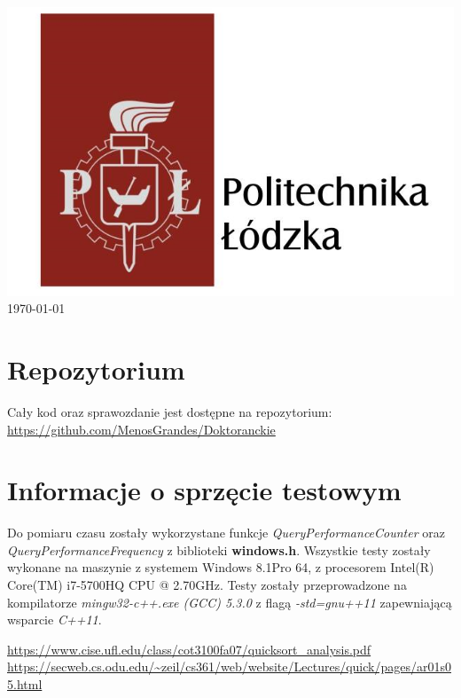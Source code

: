 \begin{titlepage}
\includegraphics[scale=0.36]{logo.png}\\[1.3cm]
 


{\large \today}\\[5cm] %

\vfill %

\end{titlepage}






 \tableofcontents 
 \section{Repozytorium}
 Cały kod oraz sprawozdanie jest dostępne na repozytorium:
 \url{https://github.com/MenosGrandes/Doktoranckie}
\section{Informacje o sprzęcie testowym}
Do pomiaru czasu zostały wykorzystane funkcje \textit{QueryPerformanceCounter} oraz \textit{QueryPerformanceFrequency} z biblioteki \textbf{windows.h}. Wszystkie testy zostały wykonane na maszynie z systemem Windows 8.1Pro 64, z procesorem Intel(R) Core(TM) i7-5700HQ CPU @ 2.70GHz. Testy zostały przeprowadzone na kompilatorze \textit{mingw32-c++.exe (GCC) 5.3.0} z flagą \textit{-std=gnu++11} zapewniającą wsparcie \textit{C++11}.


\begin{thebibliography}{99}
 \url{https://www.cise.ufl.edu/class/cot3100fa07/quicksort_analysis.pdf}
\url{https://secweb.cs.odu.edu/~zeil/cs361/web/website/Lectures/quick/pages/ar01s05.html}
\end{thebibliography}

